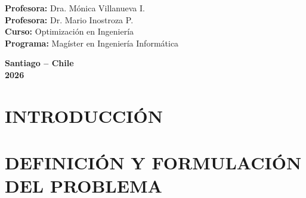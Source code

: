 \documentclass[letterpaper,12pt]{article}
\begin{document}
\begin{titlepage}
    \vspace{3cm}
    \begin{flushright}
        {\fontsize{10pt}{12pt}\selectfont
        \textbf{Profesora:} Dra. Mónica Villanueva I.\\[1em]
        \textbf{Profesora:} Dr. Mario Inostroza P.\\[1em]
        \textbf{Curso:} Optimización en Ingeniería\\[1em]
        \textbf{Programa:} Magíster en Ingeniería Informática\par}
    \end{flushright}

    \vfill
    \begin{center}
        {\fontsize{10pt}{12pt}\selectfont
        \textbf{Santiago -- Chile}\\[0.5em]
        \textbf{2026}\par}
    \end{center}
\end{titlepage}

\newpage
{}
\setcounter{page}{1}
\restoregeometry
\setlength{\parindent}{1.5cm}




\clearpage
\tableofcontents
\clearpage
\listoffigures
\clearpage

\setcounter{page}{1}

\newpage
\section{INTRODUCCIÓN}


\newpage
\section{DEFINICIÓN Y FORMULACIÓN DEL PROBLEMA}
\label{cap:definicion}


\newpage
\end{document}
